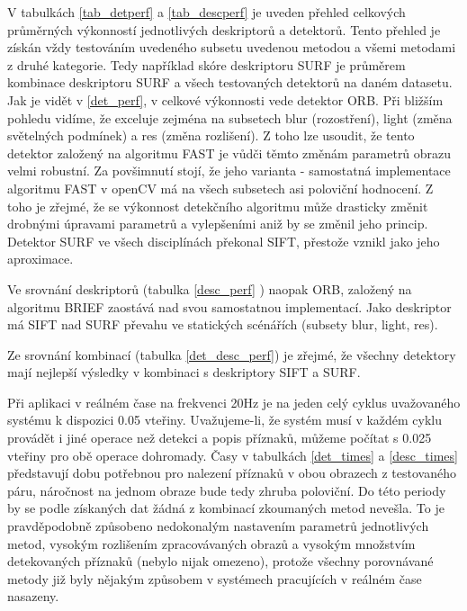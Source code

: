 





V tabulkách \ref{tab_detperf} a \ref{tab_descperf} je uveden přehled celkových průměrných výkonností jednotlivých deskriptorů
a detektorů. Tento přehled je získán vždy testováním uvedeného subsetu uvedenou metodou a všemi
metodami z druhé kategorie. Tedy například skóre deskriptoru SURF je průměrem kombinace
deskriptoru SURF a všech testovaných detektorů na daném datasetu.
Jak je vidět v \ref{det_perf}, v celkové výkonnosti vede detektor ORB. Při bližším pohledu vidíme, že exceluje
zejména na subsetech blur (rozostření), light (změna světelných podmínek) a res (změna rozlišení).
Z toho lze usoudit, že tento detektor založený na algoritmu FAST je vůdči těmto změnám parametrů obrazu
velmi robustní. Za povšimnutí stojí, že jeho varianta - samostatná implementace algoritmu FAST 
v openCV má na všech subsetech asi poloviční hodnocení. Z toho je zřejmé, že se výkonnost detekčního
algoritmu může drasticky změnit drobnými úpravami parametrů a vylepšeními aniž by se změnil jeho princip.
Detektor SURF ve všech disciplínách překonal SIFT, přestože vznikl jako jeho aproximace.

Ve srovnání deskriptorů (tabulka \ref{desc_perf} ) naopak ORB, založený na algoritmu BRIEF zaostává nad svou samostatnou implementací.
Jako deskriptor má SIFT nad SURF převahu ve statických scénářích (subsety blur, light, res).

Ze srovnání kombinací (tabulka \ref{det_desc_perf}) je zřejmé, že všechny detektory mají nejlepší výsledky v kombinaci s deskriptory SIFT a SURF.

Při aplikaci v reálném čase na frekvenci 20Hz je na jeden celý cyklus uvažovaného systému k dispozici 0.05 vteřiny. Uvažujeme-li, že systém musí v každém cyklu provádět i jiné operace než detekci a popis příznaků, můžeme počítat s 0.025 vteřiny pro obě operace dohromady. Časy v tabulkách \ref{det_times} a \ref{desc_times} představují dobu potřebnou pro nalezení příznaků v obou obrazech z testovaného páru, náročnost na jednom obraze bude tedy zhruba poloviční. Do této periody by se podle získaných dat žádná z kombinací zkoumaných metod nevešla. To je pravděpodobně způsobeno nedokonalým nastavením parametrů jednotlivých metod, vysokým rozlišením zpracovávaných obrazů a vysokým množstvím detekovaných příznaků (nebylo nijak omezeno), protože všechny porovnávané metody již byly nějakým způsobem v systémech pracujících v reálném čase nasazeny.

